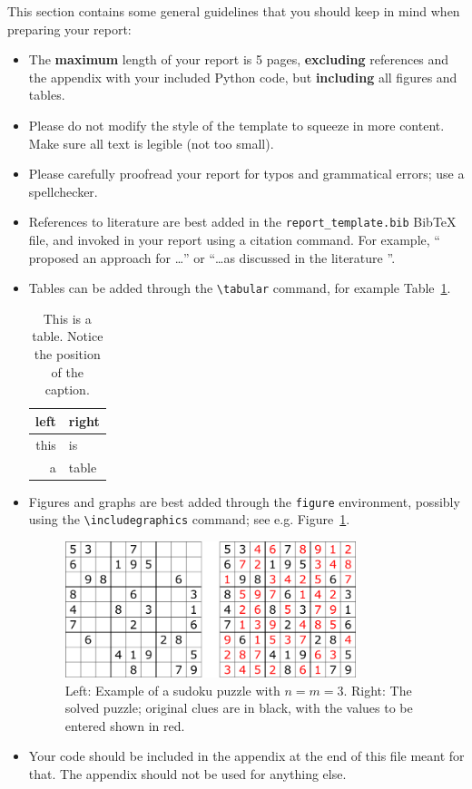 \documentclass[11pt]{article}
\begin{document}
This section contains some general guidelines that you should keep in mind when preparing your report:
\begin{itemize}
	\item
		The \textbf{maximum} length of your report is 5 pages, \textbf{excluding} references and the appendix with your included Python code, but \textbf{including} all figures and tables.
	\item
		Please do not modify the style of the template to squeeze in more content. Make sure all text is legible (not too small).
	\item
		Please carefully proofread your report for typos and grammatical errors; use a spellchecker.
	\item
		References to literature are best added in the \texttt{report\_template.bib} BibTeX file, and invoked in your report using a citation command. For example, “\citet{shannon1950xxii} proposed an approach for \dots” or “\dots as discussed in the literature \citep{shannon1950xxii}”.
	\item
		Tables can be added through the \texttt{{\textbackslash}tabular} command, for example Table~\ref{tab:a_table}.
		\begin{table}
			\centering
			\caption{This is a table. Notice the position of the caption.}\label{tab:a_table}
			\begin{tabular}{rl}
				\toprule
				\textbf{left} & \textbf{right}\\
				\midrule
				this & is \\
				a & table\\
				\bottomrule
			\end{tabular}
		\end{table}
	\item
		Figures and graphs are best added through the \texttt{figure} environment, possibly using the \texttt{{\textbackslash}includegraphics} command; see e.g. Figure~\ref{fig:example}.
		\begin{figure}
			\centering
			\includegraphics[width=0.8\textwidth]{img/sudokuexample}
			\caption{Left: Example of a sudoku puzzle with $n=m=3$. Right: The solved puzzle; original clues are in black, with the values to be entered shown in red.}\label{fig:example}
		\end{figure}
	\item
		Your code should be included in the appendix at the end of this file meant for that.
		The appendix should not be used for anything else.
\end{itemize}
\end{document}
